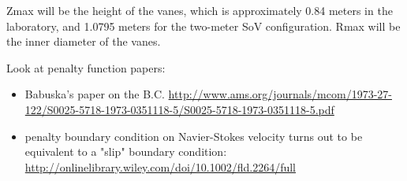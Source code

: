 \documentclass{article}
\begin{document}
Zmax will be the height of the vanes, which is approximately 0.84 meters in the laboratory, 
and 1.0795 meters for the two-meter SoV configuration. Rmax will be the inner diameter of the vanes. 

%

Look at penalty function papers: 
\begin{itemize}
 \item Babuska's paper on the B.C. \url{http://www.ams.org/journals/mcom/1973-27-122/S0025-5718-1973-0351118-5/S0025-5718-1973-0351118-5.pdf}
 \item penalty boundary condition on Navier-Stokes velocity turns out to be equivalent to a "slip" boundary condition: \url{http://onlinelibrary.wiley.com/doi/10.1002/fld.2264/full}
\end{itemize}
\end{document}
